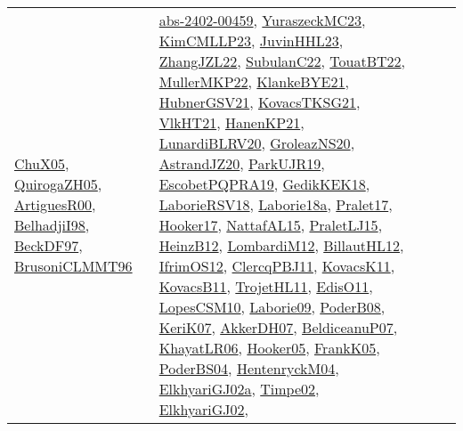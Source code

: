 {\begin{longtable}{lp{3cm}>{\raggedright}p{6cm}>{\raggedright}p{6cm}p{8cm}}
\href{papers/ChuX05.pdf}{ChuX05}\cite{ChuX05}, \href{papers/QuirogaZH05.pdf}{QuirogaZH05}\cite{QuirogaZH05}, \href{articles/ArtiguesR00.pdf}{ArtiguesR00}\cite{ArtiguesR00}, \href{articles/BelhadjiI98.pdf}{BelhadjiI98}\cite{BelhadjiI98}, \href{papers/BeckDF97.pdf}{BeckDF97}\cite{BeckDF97}, \href{papers/BrusoniCLMMT96.pdf}{BrusoniCLMMT96}\cite{BrusoniCLMMT96} & \href{articles/abs-2402-00459.pdf}{abs-2402-00459}\cite{abs-2402-00459}, \href{papers/YuraszeckMC23.pdf}{YuraszeckMC23}\cite{YuraszeckMC23}, \href{papers/KimCMLLP23.pdf}{KimCMLLP23}\cite{KimCMLLP23}, \href{papers/JuvinHHL23.pdf}{JuvinHHL23}\cite{JuvinHHL23}, \href{papers/ZhangJZL22.pdf}{ZhangJZL22}\cite{ZhangJZL22}, \href{articles/SubulanC22.pdf}{SubulanC22}\cite{SubulanC22}, \href{papers/TouatBT22.pdf}{TouatBT22}\cite{TouatBT22}, \href{articles/MullerMKP22.pdf}{MullerMKP22}\cite{MullerMKP22}, \href{papers/KlankeBYE21.pdf}{KlankeBYE21}\cite{KlankeBYE21}, \href{articles/HubnerGSV21.pdf}{HubnerGSV21}\cite{HubnerGSV21}, \href{papers/KovacsTKSG21.pdf}{KovacsTKSG21}\cite{KovacsTKSG21}, \href{articles/VlkHT21.pdf}{VlkHT21}\cite{VlkHT21}, \href{papers/HanenKP21.pdf}{HanenKP21}\cite{HanenKP21}, \href{articles/LunardiBLRV20.pdf}{LunardiBLRV20}\cite{LunardiBLRV20}, \href{papers/GroleazNS20.pdf}{GroleazNS20}\cite{GroleazNS20}, \href{articles/AstrandJZ20.pdf}{AstrandJZ20}\cite{AstrandJZ20}, \href{papers/ParkUJR19.pdf}{ParkUJR19}\cite{ParkUJR19}, \href{articles/EscobetPQPRA19.pdf}{EscobetPQPRA19}\cite{EscobetPQPRA19}, \href{articles/GedikKEK18.pdf}{GedikKEK18}\cite{GedikKEK18}, \href{articles/LaborieRSV18.pdf}{LaborieRSV18}\cite{LaborieRSV18}, \href{papers/Laborie18a.pdf}{Laborie18a}\cite{Laborie18a}, \href{papers/Pralet17.pdf}{Pralet17}\cite{Pralet17}, \href{papers/Hooker17.pdf}{Hooker17}\cite{Hooker17}, \href{articles/NattafAL15.pdf}{NattafAL15}\cite{NattafAL15}, \href{papers/PraletLJ15.pdf}{PraletLJ15}\cite{PraletLJ15}, \href{papers/HeinzB12.pdf}{HeinzB12}\cite{HeinzB12}, \href{articles/LombardiM12.pdf}{LombardiM12}\cite{LombardiM12}, \href{papers/BillautHL12.pdf}{BillautHL12}\cite{BillautHL12}, \href{papers/IfrimOS12.pdf}{IfrimOS12}\cite{IfrimOS12}, \href{papers/ClercqPBJ11.pdf}{ClercqPBJ11}\cite{ClercqPBJ11}, \href{articles/KovacsK11.pdf}{KovacsK11}\cite{KovacsK11}, \href{articles/KovacsB11.pdf}{KovacsB11}\cite{KovacsB11}, \href{articles/TrojetHL11.pdf}{TrojetHL11}\cite{TrojetHL11}, \href{papers/EdisO11.pdf}{EdisO11}\cite{EdisO11}, \href{articles/LopesCSM10.pdf}{LopesCSM10}\cite{LopesCSM10}, \href{papers/Laborie09.pdf}{Laborie09}\cite{Laborie09}, \href{papers/PoderB08.pdf}{PoderB08}\cite{PoderB08}, \href{papers/KeriK07.pdf}{KeriK07}\cite{KeriK07}, \href{papers/AkkerDH07.pdf}{AkkerDH07}\cite{AkkerDH07}, \href{papers/BeldiceanuP07.pdf}{BeldiceanuP07}\cite{BeldiceanuP07}, \href{articles/KhayatLR06.pdf}{KhayatLR06}\cite{KhayatLR06}, \href{articles/Hooker05.pdf}{Hooker05}\cite{Hooker05}, \href{papers/FrankK05.pdf}{FrankK05}\cite{FrankK05}, \href{articles/PoderBS04.pdf}{PoderBS04}\cite{PoderBS04}, \href{papers/HentenryckM04.pdf}{HentenryckM04}\cite{HentenryckM04}, \href{papers/ElkhyariGJ02a.pdf}{ElkhyariGJ02a}\cite{ElkhyariGJ02a}, \href{articles/Timpe02.pdf}{Timpe02}\cite{Timpe02}, \href{papers/ElkhyariGJ02.pdf}{ElkhyariGJ02}\cite{ElkhyariGJ02}, 
\end{longtable}}
